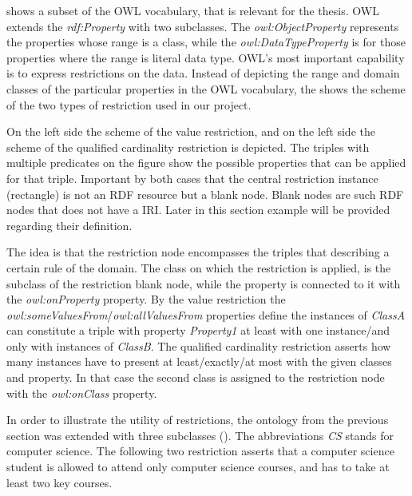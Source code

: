  shows a subset of the OWL vocabulary, that is relevant for the thesis. OWL extends the \textit{rdf:Property} with two subclasses. The \textit{owl:ObjectProperty} represents the properties whose range is a class, while the \textit{owl:DataTypeProperty} is for those properties where the range is literal data type. OWL's most important capability is to express restrictions on the data. Instead of depicting the range and domain classes of the particular properties in the OWL vocabulary, the  shows the scheme of the two types of restriction used in our project.



On the left side the scheme of the value restriction, and on the left side the scheme of the qualified cardinality restriction is depicted. The triples with multiple predicates on the figure show the possible properties that can be applied for that triple. Important by both cases that the central restriction instance (rectangle) is not an RDF resource but a blank node. Blank nodes are such RDF nodes that does not have a IRI. Later in this section example will be provided regarding their definition.

The idea is that the restriction node encompasses the triples that describing a certain rule of the domain. The class on which the restriction is applied, is the subclass of the restriction blank node, while the property is connected to it with the \textit{owl:onProperty} property. By the value restriction the \textit{owl:someValuesFrom}/\textit{owl:allValuesFrom} properties define the instances of \textit{ClassA} can constitute a triple with property \textit{Property1} at least with one instance/and only with instances of \textit{ClassB}. The qualified cardinality restriction asserts how many instances have to present at least/exactly/at most with the given classes and property. In that case the second class is assigned to the restriction node with the \textit{owl:onClass} property.


In order to illustrate the utility of restrictions, the ontology from the previous section was extended with three subclasses (). The abbreviations \textit{CS} stands for computer science. The following two restriction asserts that a computer science student is allowed to attend only computer science courses, and has to take at least two key courses.

